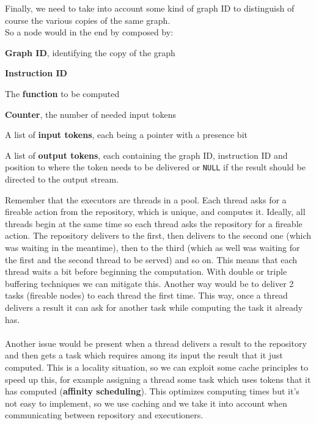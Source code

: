 \documentclass[10pt]{report}
\begin{document}
Finally, we need to take into account some kind of graph ID to distinguish of course the various copies of the same graph.\\
So a node would in the end by composed by:
\begin{list}{}{}
	\item \textbf{Graph ID}, identifying the copy of the graph
	\item \textbf{Instruction ID}
	\item The \textbf{function} to be computed 
	\item \textbf{Counter}, the number of needed input tokens
	\item A list of \textbf{input tokens}, each being a pointer with a presence bit
	\item A list of \textbf{output tokens}, each containing the graph ID, instruction ID and position to where the token needs to be delivered or \texttt{NULL} if the result should be directed to the output stream.
\end{list}
Remember that the executors are threads in a pool. Each thread asks for a fireable action from the repository, which is unique, and computes it. Ideally, all threads begin at the same time so each thread asks the repository for a fireable action. The repository delivers to the first, then delivers to the second one (which was waiting in the meantime), then to the third (which as well was waiting for the first and the second thread to be served) and so on. This means that each thread waits a bit before beginning the computation. With double or triple buffering techniques we can mitigate this. Another way would be to deliver 2 tasks (fireable nodes) to each thread the first time. This way, once a thread delivers a result it can ask for another task while computing the task it already has.\\\\
Another issue would be present when a thread delivers a result to the repository and then gets a task which requires among its input the result that it just computed. This is a locality situation, so we can exploit some cache principles to speed up this, for example assigning a thread some task which uses tokens that it has computed (\textbf{affinity scheduling}). This optimizes computing times but it's not easy to implement, so we use caching and we take it into account when communicating between repository and executioners.
\end{document}
